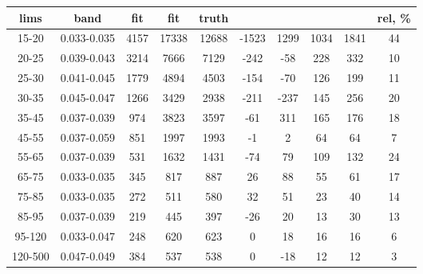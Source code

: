 \documentclass{beamer}
\begin{document}
\begin{frame}
\begin{table}[h]
\begin{center}
\begin{tabular}{|c|c|c|c|c|c|c|c|c|c|}
    lims & band & fit & fit & truth &       &      &     &      & rel, \% \\ \hline
    15-20 & 0.033-0.035 & 4157 & 17338 & 12688 & -1523 & 1299 & 1034 & 1841 & 44  \\ \hline
    20-25 & 0.039-0.043 & 3214 & 7666 & 7129 & -242 & -58 & 228 & 332 & 10  \\ \hline
    25-30 & 0.041-0.045 & 1779 & 4894 & 4503 & -154 & -70 & 126 & 199 & 11  \\ \hline
    30-35 & 0.045-0.047 & 1266 & 3429 & 2938 & -211 & -237 & 145 & 256 & 20  \\ \hline
    35-45 & 0.037-0.039 & 974 & 3823 & 3597 & -61 & 311 & 165 & 176 & 18  \\ \hline
    45-55 & 0.037-0.059 & 851 & 1997 & 1993 & -1 & 2 & 64 & 64 & 7  \\ \hline
    55-65 & 0.037-0.039 & 531 & 1632 & 1431 & -74 & 79 & 109 & 132 & 24  \\ \hline
    65-75 & 0.033-0.035 & 345 & 817 & 887 & 26 & 88 & 55 & 61 & 17  \\ \hline
    75-85 & 0.033-0.035 & 272 & 511 & 580 & 32 & 51 & 23 & 40 & 14  \\ \hline
    85-95 & 0.037-0.039 & 219 & 445 & 397 & -26 & 20 & 13 & 30 & 13  \\ \hline
    95-120 & 0.033-0.047 & 248 & 620 & 623 & 0 & 18 & 16 & 16 & 6  \\ \hline
    120-500 & 0.047-0.049 & 384 & 537 & 538 & 0 & -18 & 12 & 12 & 3  \\ \hline
  \end{tabular}
  \label{tab:systSbVar_Meth1_ELECTRON_WGamma_Endcap}
  \end{center}
\end{table}
\end{frame}
\end{document}
